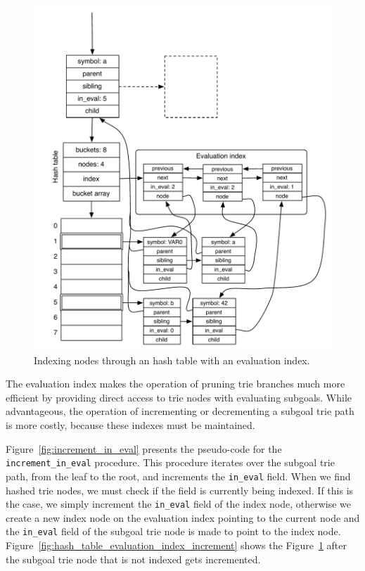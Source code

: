 \begin{figure}[ht]
  \centering
  \includegraphics[scale=0.6]{hash_table_evaluation_index.pdf}
  \caption{Indexing nodes through an hash table with an evaluation index.}
  \label{fig:hash_table_evaluation_index}
\end{figure}

The evaluation index makes the operation of pruning trie branches much more efficient by
providing direct access to trie nodes with evaluating subgoals. While advantageous,
the operation of incrementing or decrementing a subgoal trie path is more costly, because
these indexes must be maintained.

Figure~\ref{fig:increment_in_eval} presents the pseudo-code for the
\texttt{increment\_in\_eval} procedure. This procedure iterates over the subgoal trie path,
from the leaf to the root, and increments the \texttt{in\_eval} field. When we find
hashed trie nodes, we must check if the field is currently being indexed. If this is the case,
we simply increment the \texttt{in\_eval} field of the index node, otherwise we create
a new index node on the evaluation index pointing to the current node and the \texttt{in\_eval}
field of the subgoal trie node is made to point to the index node.
Figure~\ref{fig:hash_table_evaluation_index_increment} shows the
Figure~\ref{fig:hash_table_evaluation_index} after the subgoal trie node that is not
indexed gets incremented.

